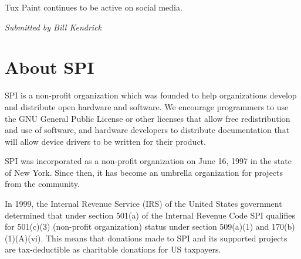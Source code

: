 \documentclass[a4paper]{report}
\begin{document}
Tux Paint continues to be active on social media.

{\em Submitted by Bill Kendrick}

\appendix
\chapter{About SPI}

SPI is a non-profit organization which was founded to help organizations develop and distribute open hardware and software. We encourage programmers to use the GNU General Public License or other licenses that allow free redistribution and use of software, and hardware developers to distribute documentation that will allow device drivers to be written for their product.

SPI was incorporated as a non-profit organization on June 16, 1997 in the state of New York. Since then, it has become an umbrella organization for projects from the community.

In 1999, the Internal Revenue Service (IRS) of the United States government determined that under section 501(a) of the Internal Revenue Code SPI qualifies for 501(c)(3) (non-profit organization) status under section 509(a)(1) and 170(b)(1)(A)(vi). This means that donations made to SPI and its supported projects are tax-deductible as charitable donations for US taxpayers.

\newpage

\pagestyle{empty}


\null
\end{document}
